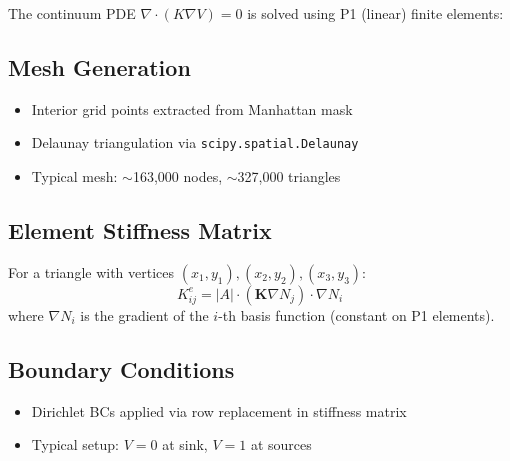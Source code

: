 \documentclass[11pt]{article}
\begin{document}
The continuum PDE $\nabla \cdot (K \nabla V) = 0$ is solved using P1 (linear) finite elements:

\subsection{Mesh Generation}
\begin{itemize}[noitemsep]
    \item Interior grid points extracted from Manhattan mask
    \item Delaunay triangulation via \texttt{scipy.spatial.Delaunay}
    \item Typical mesh: $\sim$163,000 nodes, $\sim$327,000 triangles
\end{itemize}

\subsection{Element Stiffness Matrix}
For a triangle with vertices $(x_1, y_1), (x_2, y_2), (x_3, y_3)$:
\begin{equation}
    K^e_{ij} = |A| \cdot (\mathbf{K} \nabla N_j) \cdot \nabla N_i
\end{equation}
where $\nabla N_i$ is the gradient of the $i$-th basis function (constant on P1 elements).

\subsection{Boundary Conditions}
\begin{itemize}[noitemsep]
    \item Dirichlet BCs applied via row replacement in stiffness matrix
    \item Typical setup: $V=0$ at sink, $V=1$ at sources
\end{itemize}
\end{document}
